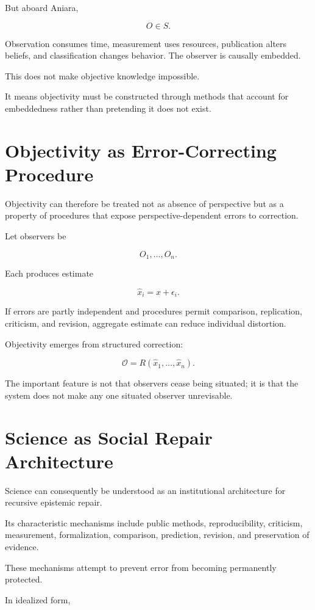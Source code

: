 \documentclass[11pt,oneside]{book}
\theoremstyle{definition}
\theoremstyle{remark}
\begin{document}
But aboard Aniara,

\[
O\in S.
\]

Observation consumes time, measurement uses resources, publication alters beliefs, and classification changes behavior. The observer is causally embedded.

This does not make objective knowledge impossible.

It means objectivity must be constructed through methods that account for embeddedness rather than pretending it does not exist.

\section{Objectivity as Error-Correcting Procedure}

Objectivity can therefore be treated not as absence of perspective but as a property of procedures that expose perspective-dependent errors to correction.

Let observers be

\[
O_1,\ldots,O_n.
\]

Each produces estimate

\[
\hat{x}_i=x+\epsilon_i.
\]

If errors are partly independent and procedures permit comparison, replication, criticism, and revision, aggregate estimate can reduce individual distortion.

Objectivity emerges from structured correction:

\[
\mathcal O
=
R(
\hat{x}_1,\ldots,\hat{x}_n
).
\]

The important feature is not that observers cease being situated; it is that the system does not make any one situated observer unrevisable.

\section{Science as Social Repair Architecture}

Science can consequently be understood as an institutional architecture for recursive epistemic repair.

Its characteristic mechanisms include public methods, reproducibility, criticism, measurement, formalization, comparison, prediction, revision, and preservation of evidence.

These mechanisms attempt to prevent error from becoming permanently protected.

In idealized form,
\end{document}

